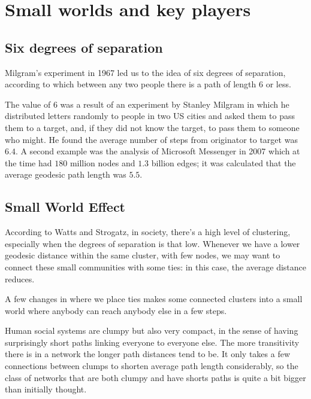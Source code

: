 \documentclass[
  notitlepage,
  onecolumn,
  openany]{book}
\begin{document}
\hypertarget{small-worlds-and-key-players}{%
\section{Small worlds and key players}\label{small-worlds-and-key-players}}

\hypertarget{six-degrees-of-separation}{%
\subsection{Six degrees of separation}\label{six-degrees-of-separation}}

Milgram's experiment in 1967 led us to the idea of six degrees of
separation, according to which between any two people there is a path of
length \(6\) or less.

The value of \(6\) was a result of an experiment by Stanley Milgram in
which he distributed letters randomly to people in two US cities and
asked them to pass them to a target, and, if they did not know the
target, to pass them to someone who might. He found the average number
of steps from originator to target was \(6.4\). A second example was the
analysis of Microsoft Messenger in 2007 which at the time had \(180\)
million nodes and \(1.3\) billion edges; it was calculated that the
average geodesic path length was \(5.5\).

\hypertarget{small-world-effect}{%
\subsection{Small World Effect}\label{small-world-effect}}

According to Watts and Strogatz, in society, there's a high level of
clustering, especially when the degrees of separation is that low.
Whenever we have a lower geodesic distance within the same cluster, with
few nodes, we may want to connect these small communities with some
ties: in this case, the average distance reduces.

A few changes in where we place ties makes some connected clusters into
a small world where anybody can reach anybody else in a few steps.

Human social systems are clumpy but also very compact, in the sense of
having surprisingly short paths linking everyone to everyone else. The
more transitivity there is in a network the longer path distances tend
to be. It only takes a few connections between clumps to shorten average
path length considerably, so the class of networks that are both clumpy
and have shorts paths is quite a bit bigger than initially thought.
\end{document}
